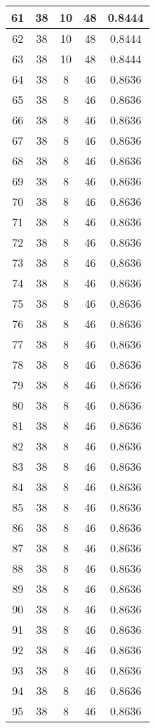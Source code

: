 \documentclass[letterpaper, 12pt]{article}
\begin{document}
\begin{longtable}{|c|c|c|c|c|}
\hline
61 & 38 & 10 & 48 & 0.8444 \\
\hline
62 & 38 & 10 & 48 & 0.8444 \\
\hline
63 & 38 & 10 & 48 & 0.8444 \\
\hline
64 & 38 & 8 & 46 & 0.8636 \\
\hline
65 & 38 & 8 & 46 & 0.8636 \\
\hline
66 & 38 & 8 & 46 & 0.8636 \\
\hline
67 & 38 & 8 & 46 & 0.8636 \\
\hline
68 & 38 & 8 & 46 & 0.8636 \\
\hline
69 & 38 & 8 & 46 & 0.8636 \\
\hline
70 & 38 & 8 & 46 & 0.8636 \\
\hline
71 & 38 & 8 & 46 & 0.8636 \\
\hline
72 & 38 & 8 & 46 & 0.8636 \\
\hline
73 & 38 & 8 & 46 & 0.8636 \\
\hline
74 & 38 & 8 & 46 & 0.8636 \\
\hline
75 & 38 & 8 & 46 & 0.8636 \\
\hline
76 & 38 & 8 & 46 & 0.8636 \\
\hline
77 & 38 & 8 & 46 & 0.8636 \\
\hline
78 & 38 & 8 & 46 & 0.8636 \\
\hline
79 & 38 & 8 & 46 & 0.8636 \\
\hline
80 & 38 & 8 & 46 & 0.8636 \\
\hline
81 & 38 & 8 & 46 & 0.8636 \\
\hline
82 & 38 & 8 & 46 & 0.8636 \\
\hline
83 & 38 & 8 & 46 & 0.8636 \\
\hline
84 & 38 & 8 & 46 & 0.8636 \\
\hline
85 & 38 & 8 & 46 & 0.8636 \\
\hline
86 & 38 & 8 & 46 & 0.8636 \\
\hline
87 & 38 & 8 & 46 & 0.8636 \\
\hline
88 & 38 & 8 & 46 & 0.8636 \\
\hline
89 & 38 & 8 & 46 & 0.8636 \\
\hline
90 & 38 & 8 & 46 & 0.8636 \\
\hline
91 & 38 & 8 & 46 & 0.8636 \\
\hline
92 & 38 & 8 & 46 & 0.8636 \\
\hline
93 & 38 & 8 & 46 & 0.8636 \\
\hline
94 & 38 & 8 & 46 & 0.8636 \\
\hline
95 & 38 & 8 & 46 & 0.8636 \\

\end{longtable}
\end{document}
